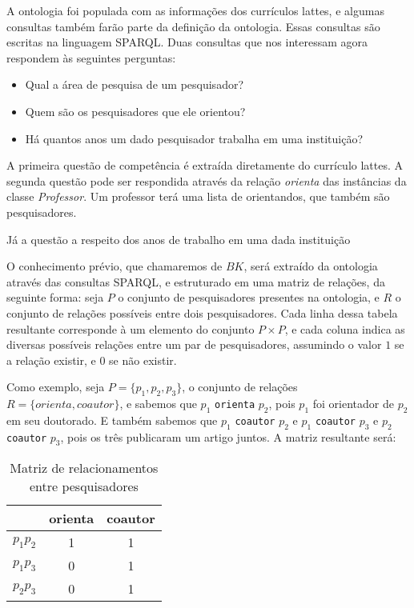 A ontologia foi populada com as informações dos currículos lattes, e algumas consultas também farão parte da definição da ontologia. Essas consultas são escritas na linguagem SPARQL. Duas consultas que nos interessam agora respondem às seguintes perguntas:

\begin{itemize}
    \item Qual a área de pesquisa de um pesquisador?
    \item Quem são os pesquisadores que ele orientou?
    \item Há quantos anos um dado pesquisador trabalha em uma instituição?
\end{itemize}

A primeira questão de competência é extraída diretamente do currículo lattes. A segunda questão pode ser respondida através da relação \textit{orienta} das instâncias da classe \textit{Professor}. Um professor terá uma lista de orientandos, que também são pesquisadores.

Já a questão a respeito dos anos de trabalho em uma dada instituição


O conhecimento prévio, que chamaremos de $BK$, será extraído da ontologia através das consultas SPARQL, e estruturado em uma matriz de relações, da seguinte forma: seja $P$ o conjunto de pesquisadores presentes na ontologia, e $R$ o conjunto de relações possíveis entre dois pesquisadores.  Cada linha dessa tabela resultante corresponde à um elemento do conjunto $P \times P$, e cada coluna indica as diversas possíveis relações entre um par de pesquisadores, assumindo o valor $1$ se a relação existir, e $0$ se não existir.

Como exemplo, seja $P = \{ p_1, p_2, p_3 \}$, o conjunto de relações $R = \{ orienta, coautor \}$, e sabemos que $p_1$ \texttt{orienta} $p_2$, pois $p_1$ foi orientador de $p_2$ em seu doutorado. E também sabemos que $p_1$ \texttt{coautor} $p_2$ e $p_1$ \texttt{coautor} $p_3$ e $p_2$ \texttt{coautor} $p_3$, pois os três publicaram um artigo juntos. A matriz resultante será:

\begin{table}[h!]
    \centering
    \begin{tabular}{|c|c|c|}
     \hline
      & orienta & coautor \\
     \hline\hline
     $p_1 p_2$ & 1 & 1  \\
     \hline
     $p_1 p_3$ & 0 & 1  \\
     \hline
     $p_2 p_3$ & 0 & 1  \\
     \hline
    \end{tabular}
    \caption{Matriz de relacionamentos entre pesquisadores}
    \label{matriz-relacoes}
\end{table}

